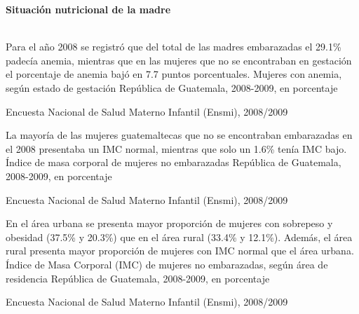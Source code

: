 \begin{center}
	\textbf{\color{color2}\LARGE \thesection} \quad  \textbf{\LARGE Situación nutricional de la madre} 
\end{center}
$ \ $ \\[-5cm]%

{Para el año 2008 se registró que del total de las madres embarazadas el 29.1\% padecía anemia, mientras que en las mujeres que no se encontraban en gestación el porcentaje de anemia bajó en 7.7 puntos porcentuales. 
 }%
{%
 Mujeres con anemia, según estado de gestación} %
{%
 República de Guatemala, 2008-2009, en porcentaje} %
{%
 \begin{tikzpicture}[x=1pt,y=1pt]    \end{tikzpicture}}%
{%
Encuesta Nacional de Salud Materno Infantil (Ensmi), 2008/2009 } %


%
{%
	La mayoría de las mujeres guatemaltecas que no se encontraban embarazadas en el 2008 presentaba un IMC normal, mientras que solo un 1.6\% tenía IMC bajo. 
}%
{%
	Índice de masa corporal de mujeres no embarazadas} %
{%
	República de Guatemala, 2008-2009, en porcentaje} %
{%
	\begin{tikzpicture}[x=1pt,y=1pt]    \end{tikzpicture}}%
{%
	Encuesta Nacional de Salud Materno Infantil (Ensmi), 2008/2009} %



%
{%
	En el área urbana se presenta mayor proporción de mujeres con sobrepeso y obesidad (37.5\% y 20.3\%) que en el área rural (33.4\% y 12.1\%). 
	Además, el área rural presenta mayor proporción de mujeres con IMC normal que el área urbana. 
}%
{%
	Índice de Masa Corporal (IMC) de mujeres no embarazadas, según área de residencia} %
{%
	República de Guatemala, 2008-2009, en porcentaje} %
{%
	\begin{tikzpicture}[x=1pt,y=1pt]    \end{tikzpicture}}%
{%
	Encuesta Nacional de Salud Materno Infantil (Ensmi), 2008/2009} %


